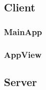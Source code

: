 





\subsection{Client}

\subsubsection{MainApp}

\subsubsection{AppView}




\subsection{Server}

